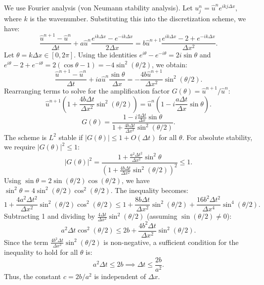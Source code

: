 \begin{solution}
We use Fourier analysis (von Neumann stability analysis). Let $u_j^n = \hat{u}^n e^{i k j \Delta x}$, where $k$ is the wavenumber. Substituting this into the discretization scheme, we have:
\[
\frac{\hat{u}^{n+1}-\hat{u}^n}{\Delta t} + a \hat{u}^n \frac{e^{ik\Delta x} - e^{-ik\Delta x}}{2\Delta x} = b \hat{u}^{n+1} \frac{e^{ik\Delta x} - 2 + e^{-ik\Delta x}}{\Delta x^2}.
\]
Let $\theta = k\Delta x \in [0, 2\pi]$. Using the identities $e^{i\theta} - e^{-i\theta} = 2i\sin\theta$ and $e^{i\theta} - 2 + e^{-i\theta} = 2(\cos\theta - 1) = -4\sin^2(\theta/2)$, we obtain:
\[
\frac{\hat{u}^{n+1}-\hat{u}^n}{\Delta t} + i a \hat{u}^n \frac{\sin\theta}{\Delta x} = - \frac{4b\hat{u}^{n+1}}{\Delta x^2} \sin^2(\theta/2).
\]
Rearranging terms to solve for the amplification factor $G(\theta) = \hat{u}^{n+1}/\hat{u}^n$:
\[
\hat{u}^{n+1} \left( 1 + \frac{4b\Delta t}{\Delta x^2} \sin^2(\theta/2) \right) = \hat{u}^n \left( 1 - i \frac{a\Delta t}{\Delta x} \sin\theta \right).
\]
\[
G(\theta) = \frac{1 - i \frac{a\Delta t}{\Delta x} \sin\theta}{1 + \frac{4b\Delta t}{\Delta x^2} \sin^2(\theta/2)}.
\]
The scheme is $L^2$ stable if $|G(\theta)| \leq 1 + O(\Delta t)$ for all $\theta$. For absolute stability, we require $|G(\theta)|^2 \leq 1$:
\[
|G(\theta)|^2 = \frac{1 + \frac{a^2 \Delta t^2}{\Delta x^2} \sin^2\theta}{\left( 1 + \frac{4b\Delta t}{\Delta x^2} \sin^2(\theta/2) \right)^2} \leq 1.
\]
Using $\sin\theta = 2\sin(\theta/2)\cos(\theta/2)$, we have $\sin^2\theta = 4\sin^2(\theta/2)\cos^2(\theta/2)$. The inequality becomes:
\[
1 + \frac{4a^2 \Delta t^2}{\Delta x^2} \sin^2(\theta/2)\cos^2(\theta/2) \leq 1 + \frac{8b\Delta t}{\Delta x^2} \sin^2(\theta/2) + \frac{16b^2 \Delta t^2}{\Delta x^4} \sin^4(\theta/2).
\]
Subtracting 1 and dividing by $\frac{4\Delta t}{\Delta x^2} \sin^2(\theta/2)$ (assuming $\sin(\theta/2) \neq 0$):
\[
a^2 \Delta t \cos^2(\theta/2) \leq 2b + \frac{4b^2 \Delta t}{\Delta x^2} \sin^2(\theta/2).
\]
Since the term $\frac{4b^2 \Delta t}{\Delta x^2} \sin^2(\theta/2)$ is non-negative, a sufficient condition for the inequality to hold for all $\theta$ is:
\[
a^2 \Delta t \leq 2b \implies \Delta t \leq \frac{2b}{a^2}.
\]
Thus, the constant $c = 2b/a^2$ is independent of $\Delta x$.
\end{solution}

